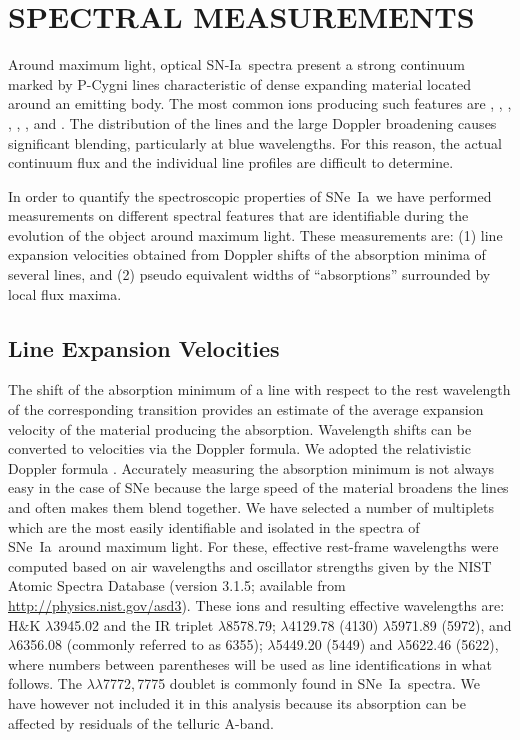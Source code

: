 \documentclass[apj]{emulateapj-rtx4}
\newcommand{\sndia}{SN-Ia}
\newcommand{\sneia}{SNe~Ia}
\begin{document}
\section{SPECTRAL MEASUREMENTS}
\label{sec:meas}

Around maximum light, optical \sndia\ spectra present a strong
continuum marked by P-Cygni lines characteristic of dense
expanding material located around an emitting body. The most common ions
producing such features are , , ,
, , , and . The
distribution of the lines and the large Doppler broadening causes
significant blending, particularly at blue wavelengths. For this
reason, the actual continuum flux and the individual line profiles are
difficult to determine. 

In order to quantify the spectroscopic properties of \sneia\ we have
performed measurements on different spectral features that are
identifiable during the evolution of the object around maximum
light. These measurements are: (1) line expansion velocities obtained
from Doppler shifts of the absorption minima of several lines, and (2)
pseudo equivalent widths of ``absorptions'' surrounded by local flux
maxima. 

\subsection{Line Expansion Velocities}
\label{sec:vel}

The shift of the absorption minimum of a line with respect to the rest
wavelength of the corresponding transition provides an estimate of the
average expansion velocity of the material producing the
absorption. Wavelength shifts can be converted to velocities via the
Doppler formula. We adopted the relativistic Doppler formula
\citep[see Equation~(6) of][]{blondin06}. Accurately measuring the
absorption minimum  
is not always easy in the case of SNe because the large speed of the
material broadens the lines and often makes them blend together. We
have selected a number of multiplets which are the most easily 
identifiable and isolated in the spectra of \sneia\ around maximum
light. For these, effective rest-frame wavelengths 
were computed based on air wavelengths and oscillator strengths
given by the NIST Atomic Spectra Database (version 3.1.5; available
from \url{http://physics.nist.gov/asd3}).
These ions and resulting effective wavelengths are:  H$\&$K
$\lambda$3945.02 and the IR triplet $\lambda$8578.79; 
 $\lambda$4129.78 (4130) $\lambda$5971.89 (5972), and 
$\lambda$6356.08 (commonly referred to as 6355);
 $\lambda$5449.20 (5449) and $\lambda$5622.46 (5622),
where numbers between parentheses will be used as line identifications
in what follows. The  $\lambda$$\lambda$7772,\,7775
  doublet is commonly found in \sneia\ spectra. We have however not
  included it in this analysis because its absorption can be affected
  by residuals of the telluric A-band.
\end{document}
